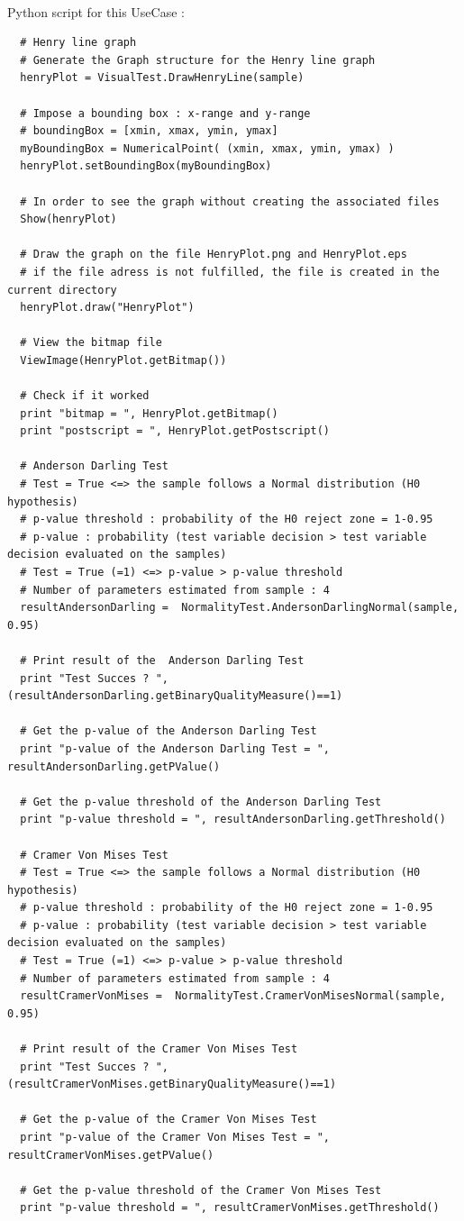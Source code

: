 \textspace\\
Python script for this UseCase :

\begin{lstlisting}
  # Henry line graph
  # Generate the Graph structure for the Henry line graph
  henryPlot = VisualTest.DrawHenryLine(sample)

  # Impose a bounding box : x-range and y-range
  # boundingBox = [xmin, xmax, ymin, ymax]
  myBoundingBox = NumericalPoint( (xmin, xmax, ymin, ymax) )
  henryPlot.setBoundingBox(myBoundingBox)

  # In order to see the graph without creating the associated files
  Show(henryPlot)

  # Draw the graph on the file HenryPlot.png and HenryPlot.eps
  # if the file adress is not fulfilled, the file is created in the current directory
  henryPlot.draw("HenryPlot")

  # View the bitmap file
  ViewImage(HenryPlot.getBitmap())

  # Check if it worked
  print "bitmap = ", HenryPlot.getBitmap()
  print "postscript = ", HenryPlot.getPostscript()

  # Anderson Darling Test
  # Test = True <=> the sample follows a Normal distribution (H0 hypothesis)
  # p-value threshold : probability of the H0 reject zone = 1-0.95
  # p-value : probability (test variable decision > test variable decision evaluated on the samples)
  # Test = True (=1) <=> p-value > p-value threshold
  # Number of parameters estimated from sample : 4
  resultAndersonDarling =  NormalityTest.AndersonDarlingNormal(sample, 0.95)

  # Print result of the  Anderson Darling Test
  print "Test Succes ? ", (resultAndersonDarling.getBinaryQualityMeasure()==1)

  # Get the p-value of the Anderson Darling Test
  print "p-value of the Anderson Darling Test = ", resultAndersonDarling.getPValue()

  # Get the p-value threshold of the Anderson Darling Test
  print "p-value threshold = ", resultAndersonDarling.getThreshold()

  # Cramer Von Mises Test
  # Test = True <=> the sample follows a Normal distribution (H0 hypothesis)
  # p-value threshold : probability of the H0 reject zone = 1-0.95
  # p-value : probability (test variable decision > test variable decision evaluated on the samples)
  # Test = True (=1) <=> p-value > p-value threshold
  # Number of parameters estimated from sample : 4
  resultCramerVonMises =  NormalityTest.CramerVonMisesNormal(sample, 0.95)

  # Print result of the Cramer Von Mises Test
  print "Test Succes ? ", (resultCramerVonMises.getBinaryQualityMeasure()==1)

  # Get the p-value of the Cramer Von Mises Test
  print "p-value of the Cramer Von Mises Test = ", resultCramerVonMises.getPValue()

  # Get the p-value threshold of the Cramer Von Mises Test
  print "p-value threshold = ", resultCramerVonMises.getThreshold()
\end{lstlisting}

